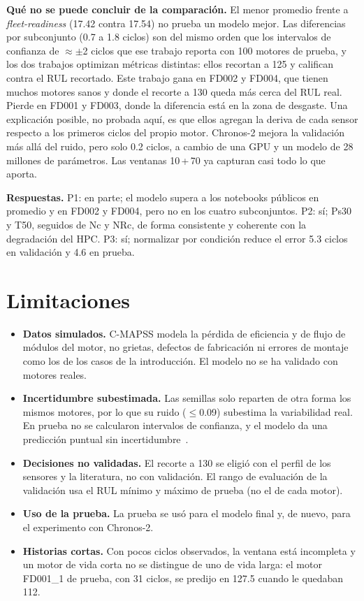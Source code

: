 \documentclass[conference]{IEEEtran}
\begin{document}
\textbf{Qué no se puede concluir de la comparación.} El menor promedio frente a \emph{fleet-readiness} (17.42 contra 17.54) no prueba un modelo mejor. Las diferencias por subconjunto (0.7 a 1.8 ciclos) son del mismo orden que los intervalos de confianza de $\approx\pm$2 ciclos que ese trabajo reporta con 100 motores de prueba, y los dos trabajos optimizan métricas distintas: ellos recortan a 125 y califican contra el RUL recortado. Este trabajo gana en FD002 y FD004, que tienen muchos motores sanos y donde el recorte a 130 queda más cerca del RUL real. Pierde en FD001 y FD003, donde la diferencia está en la zona de desgaste. Una explicación posible, no probada aquí, es que ellos agregan la deriva de cada sensor respecto a los primeros ciclos del propio motor. Chronos-2 mejora la validación más allá del ruido, pero solo 0.2 ciclos, a cambio de una GPU y un modelo de 28 millones de parámetros. Las ventanas 10\,+\,70 ya capturan casi todo lo que aporta.

\textbf{Respuestas.} P1: en parte; el modelo supera a los notebooks públicos en promedio y en FD002 y FD004, pero no en los cuatro subconjuntos. P2: sí; Ps30 y T50, seguidos de Nc y NRc, de forma consistente y coherente con la degradación del HPC. P3: sí; normalizar por condición reduce el error 5.3 ciclos en validación y 4.6 en prueba.

\section{Limitaciones}

\begin{itemize}
\item \textbf{Datos simulados.} C-MAPSS modela la pérdida de eficiencia y de flujo de módulos del motor, no grietas, defectos de fabricación ni errores de montaje como los de los casos de la introducción. El modelo no se ha validado con motores reales.
\item \textbf{Incertidumbre subestimada.} Las semillas solo reparten de otra forma los mismos motores, por lo que su ruido ($\le$0.09) subestima la variabilidad real. En prueba no se calcularon intervalos de confianza, y el modelo da una predicción puntual sin incertidumbre~\cite{vollert,rostami}.
\item \textbf{Decisiones no validadas.} El recorte a 130 se eligió con el perfil de los sensores y la literatura, no con validación. El rango de evaluación de la validación usa el RUL mínimo y máximo de prueba (no el de cada motor).
\item \textbf{Uso de la prueba.} La prueba se usó para el modelo final y, de nuevo, para el experimento con Chronos-2.
\item \textbf{Historias cortas.} Con pocos ciclos observados, la ventana está incompleta y un motor de vida corta no se distingue de uno de vida larga: el motor FD001\_1 de prueba, con 31 ciclos, se predijo en 127.5 cuando le quedaban 112.
\end{itemize}
\end{document}
